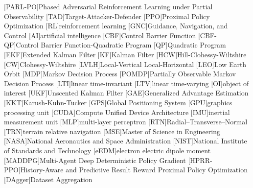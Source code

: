 \begin{acronym}
    [PARL-PO]{Phased Adversarial Reinforcement Learning under Partial Observability}
    [TAD]{Target-Attacker-Defender}
    [PPO]{Proximal Policy Optimization}
    [RL]{reinforcement learning}
    [GNC]{Guidance, Navigation, and Control}
    [AI]{artificial intelligence}
    [CBF]{Control Barrier Function}
    [CBF-QP]{Control Barrier Function-Quadratic Program}
    [QP]{Quadratic Program}
    [EKF]{Extended Kalman Filter}
    [KF]{Kalman Filter}
    [HCW]{Hill-Clohessy-Wiltshire}
    [CW]{Clohessy-Wiltshire}
    [LVLH]{Local-Vertical Local-Horizontal}
    [LEO]{Low Earth Orbit}
    [MDP]{Markov Decision Process}
    [POMDP]{Partially Observable Markov Decision Process}
    [LTI]{linear time-invariant}
    [LTV]{linear time-varying}
    [OI]{object of interest}
    [UKF]{Unscented Kalman Filter}
    [GAE]{Generalized Advantage Estimation}
    [KKT]{Karush-Kuhn-Tucker}
    [GPS]{Global Positioning System}
    [GPU]{graphics processing unit}
    [CUDA]{Compute Unified Device Architecture}
    [IMU]{inertial measurement unit}
    [MLP]{multi-layer perceptron}
    [RTN]{Radial--Transverse--Normal}
    [TRN]{terrain relative navigation}
    [MSE]{Master of Science in Engineering}
    [NASA]{National Aeronautics and Space Administration}
    [NIST]{National Institute of Standards and Technology}
    [eEDM]{electron electric dipole moment}
    [MADDPG]{Multi-Agent Deep Deterministic Policy Gradient}
    [HPRR-PPO]{History-Aware and Predictive Result Reward Proximal Policy Optimization}
    [DAgger]{Dataset Aggregation}
\end{acronym}
